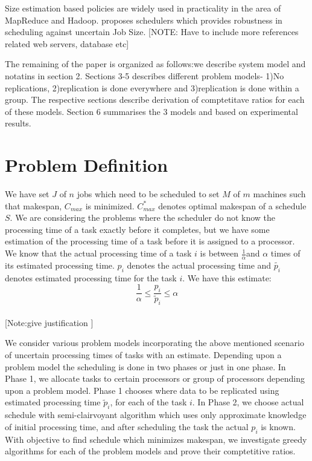 \documentclass[10pt, conference, compsocconf]{IEEEtran}
\begin{document}
Size estimation based policies are widely used in practicality in the area of MapReduce and Hadoop. \cite{IEEEhowto:Wolf} \cite{IEEEhowto:Pastorelli} proposes schedulers which provides robustness in scheduling against uncertain Job Size. [NOTE: Have to include more references related web servers, database etc] 

The remaining of the paper is organized as follows:we describe system model and notatins in section 2. Sections 3-5 describes different problem models- 1)No replications, 2)replication is done everywhere and 3)replication is done within a group. The respective sections describe derivation of comptetitave ratios for each of these models. Section 6 summarises the 3 models and based on experimental results.  

\section{Problem Definition}
We have set $J$ of $n$ jobs which need to be scheduled to set $M$ of $m$ machines such that makespan, $C_{max}$ is minimized.   $C_{max}^{*}$ denotes optimal makespan of a schedule $S$.   We are considering the problems where the scheduler do not know the processing time of a task exactly before it completes, but we have some estimation of the processing time of a task before it is  assigned to a processor. We know that the actual processing time of a task $i$ is between $\frac{1}{\alpha}$and $\alpha$ times of its estimated processing time. $p_i$ denotes the actual processing time and $\tilde {p_i}$ denotes
estimated processing time for the task $i$.  We have this estimate:\\
\begin{equation} 
\frac{1}{\alpha}\leq \frac{p_{i}}{\tilde{p}_{i}}\leq \alpha
\end{equation}\\

[Note:give justification ]


We consider various problem models  incorporating the above mentioned scenario of uncertain processing times of tasks with an estimate. Depending upon  a problem model the scheduling is done in two phases or just in one phase. In Phase 1, we allocate tasks to certain processors or group of processors depending upon a problem model.  Phase 1 chooses where data to be  replicated using estimated processing time $\tilde p_i $, for each of the task $i$.  In Phase 2, we choose actual schedule with semi-clairvoyant algorithm which uses only approximate knowledge of initial processing time, and after scheduling the task the actual $p_i$ is known.  With  objective to find schedule which minimizes makespan, we investigate greedy algorithms for each of the problem models and prove their comptetitive ratios. \\
\end{document}
